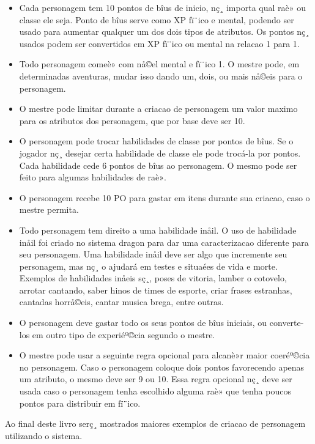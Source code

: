 \begin{itemize}
	\item Cada personagem tem 10 pontos de bîus de inicio, nç¸ importa qual raè» ou classe ele seja. Ponto de bîus serve como XP fï¨ico e mental, podendo ser usado para aumentar qualquer um dos dois tipos de atributos. Os pontos nç¸ usados podem ser convertidos em XP fï¨ico ou mental na relacao 1 para 1.
	\item Todo personagem comeè» com nå©el mental e fï¨ico 1. O mestre pode, em determinadas aventuras, mudar isso dando um, dois, ou mais nå©eis para o personagem.
	\item O mestre pode limitar durante a criacao de personagem um valor maximo para os atributos dos personagem, que por base deve ser 10.	
	\item O personagem pode trocar habilidades de classe por pontos de bîus. Se o jogador nç¸ desejar certa habilidade de classe ele pode trocá-la por pontos. Cada habilidade cede 6 pontos de bîus ao personagem. O mesmo pode ser feito para algumas habilidades de raè».
	\item O personagem recebe 10 PO para gastar em itens durante sua criacao, caso o mestre permita.
	\item Todo personagem tem direito a uma habilidade inåil. O uso de habilidade inåil foi criado no sistema dragon para dar uma caracterizacao diferente para seu personagem. Uma habilidade inåil deve ser algo que incremente seu personagem, mas nç¸ o ajudará em testes e situaées de vida e morte. Exemplos de habilidades inåeis sç¸, poses de vitoria, lamber o cotovelo, arrotar cantando, saber hinos de times de esporte, criar frases estranhas, cantadas horrå©eis, cantar musica brega, entre outras.
	\item O personagem deve gastar todo os seus pontos de bîus iniciais, ou converte-los em outro tipo de experiéº©cia segundo o mestre.
	\item O mestre pode usar a seguinte regra opcional para alcanè»r maior coeréº©cia no personagem. Caso o personagem coloque dois pontos favorecendo apenas um atributo, o mesmo deve ser 9 ou 10. Essa regra opcional nç¸ deve ser usada caso o personagem tenha escolhido alguma raè» que tenha poucos pontos para distribuir em fï¨ico.
\end{itemize}

Ao final deste livro serç¸ mostrados maiores exemplos de criacao de personagem utilizando o sistema.



